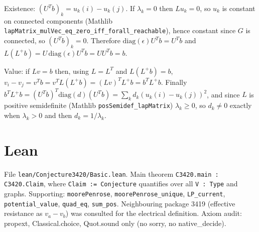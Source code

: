 \documentclass[11pt]{article}
\begin{document}
Existence: $(U^Tb)_k=u_k(i)-u_k(j)$. If $\lambda_k=0$ then $Lu_k=0$, so $u_k$ is constant on connected components (Mathlib \texttt{lapMatrix\_mulVec\_eq\_zero\_iff\_forall\_reachable}), hence constant since $G$ is connected, so $(U^Tb)_k=0$. Therefore $\mathrm{diag}(\epsilon)U^Tb=U^Tb$ and $L(L^+b)=U\,\mathrm{diag}(\epsilon)U^Tb=UU^Tb=b$.

Value: if $Lv=b$ then, using $L=L^T$ and $L(L^+b)=b$, $v_i-v_j=v^Tb=v^TL(L^+b)=(Lv)^TL^+b=b^TL^+b$. Finally $b^TL^+b=(U^Tb)^T\mathrm{diag}(d)(U^Tb)=\sum_k d_k(u_k(i)-u_k(j))^2$, and since $L$ is positive semidefinite (Mathlib \texttt{posSemidef\_lapMatrix}) $\lambda_k\ge0$, so $d_k\neq0$ exactly when $\lambda_k>0$ and then $d_k=1/\lambda_k$.

\section*{Lean}
File \texttt{lean/Conjecture3420/Basic.lean}. Main theorem \texttt{C3420.main : C3420.Claim}, where \texttt{Claim := Conjecture} quantifies over all \texttt{V : Type} and graphs. Supporting: \texttt{moorePenrose}, \texttt{moorePenrose\_unique}, \texttt{LP\_current}, \texttt{potential\_value}, \texttt{quad\_eq}, \texttt{sum\_pos}. Neighbouring package 3419 (effective resistance as $v_a-v_b$) was consulted for the electrical definition. Axiom audit: propext, Classical.choice, Quot.sound only (no sorry, no native\_decide).
\end{document}

